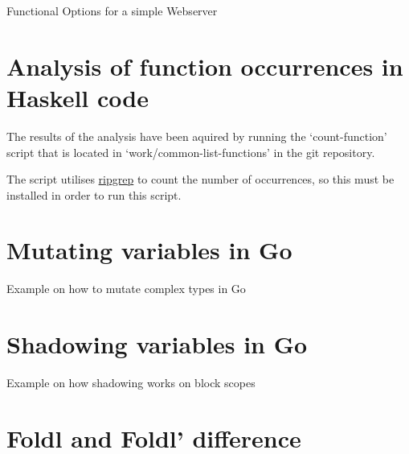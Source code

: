 \begin{code}
    \caption{Functional Options for a simple Webserver}
\end{code}

\section{Analysis of function occurrences in Haskell code}\label{appendix:function-occurrences}
The results of the analysis have been aquired by running the `count-function' script
that is located in `work/common-list-functions' in the git repository\autocite{git-repo}.

The script utilises \href{https://github.com/BurntSushi/ripgrep}{ripgrep} to count the number of occurrences, so
this must be installed in order to run this script.

\section{Mutating variables in Go}\label{appendix:mutation}
\begin{code}
	\caption{Example on how to mutate complex types in Go}
\end{code}

\section{Shadowing variables in Go}\label{appendix:shadowing}
\begin{code}
	\caption{Example on how shadowing works on block scopes}
\end{code}

\section{Foldl and Foldl' difference}\label{appendix:foldl-strictness}

